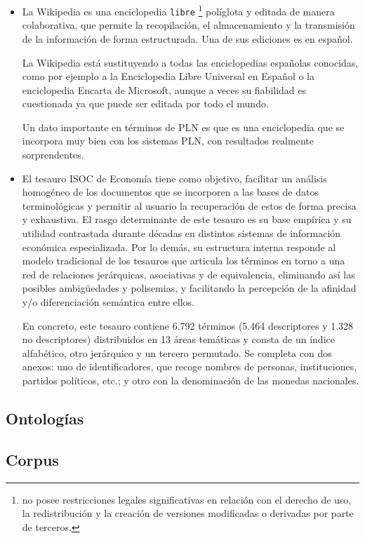 \documentclass[11pt]{exam}
\begin{document}
\begin{questions}
\begin{itemize}
	\item La Wikipedia es una enciclopedia \texttt{libre} \footnote{no posee restricciones legales significativas en relación con el derecho de uso, la redistribución y la creación de versiones modificadas o derivadas por parte de terceros.} políglota y editada de manera colaborativa, que permite la recopilación, el almacenamiento y la transmisión de la información de forma estructurada. Una de sus ediciones es en español.
	
	La Wikipedia está sustituyendo a todas las enciclopedias españolas conocidas, como por ejemplo a la Enciclopedia Libre Universal en Español o la enciclopedia Encarta de Microsoft, aunque a veces su fiabilidad es cuestionada ya que puede ser editada por todo el mundo.
	
	Un dato importante en términos de PLN es que es una enciclopedia que se incorpora muy bien con los sistemas PLN, con resultados realmente sorprendentes.
	
	\item El tesauro ISOC de Economía tiene como objetivo, facilitar un análisis homogéneo de los documentos que se incorporen a las bases de datos terminológicas y permitir al usuario la recuperación de estos de forma precisa y exhaustiva. El rasgo determinante de este tesauro es su base empírica y su utilidad contrastada durante décadas en distintos sistemas de información económica especializada. Por lo demás, su estructura interna responde al modelo tradicional de los tesauros que articula los términos en torno a una red de relaciones jerárquicas, asociativas y de equivalencia, eliminando así las posibles ambigüedades y polisemias, y facilitando la percepción de la afinidad y/o diferenciación semántica entre ellos. 
	
	En concreto, este tesauro contiene 6.792 términos (5.464 descriptores y 1.328 no descriptores) distribuidos en 13 áreas temáticas y consta de un índice alfabético, otro jerárquico y un tercero permutado. Se completa con dos anexos: uno de identificadores, que recoge nombres de personas, instituciones, partidos políticos, etc.; y otro con la denominación de las monedas nacionales. 
	 
\end{itemize}

\subsection*{Ontologías}

\subsection*{Corpus}


\end{questions}
\end{document}
